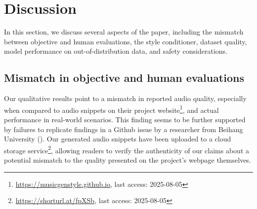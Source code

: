 \documentclass[a4paper,12pt,twoside]{article}
\begin{document}
\begin{table}[!h]
    \caption{Representative responses when evaluating generated audio}
    \centering
    \label{tab:common_quotes}
\end{table}

\section{Discussion}\label{sec:discussion}

In this section, we discuss several aspects of the paper, including the mismatch between objective and human evaluations, the style conditioner, dataset quality, model performance on out-of-distribution data, and safety considerations.

\subsection{Mismatch in objective and human evaluations}

Our qualitative results point to a mismatch in reported audio quality, especially when compared to audio snippets on their project website\footnote{\url{https://musicgenstyle.github.io}, last access: 2025-08-05}, and actual performance in real-world scenarios. This finding seems to be further supported by failures to replicate findings in a Github issue by a researcher from Beihang University (\cite{liuLargeDiscrepancyCLAP2024}). Our generated audio snippets have been uploaded to a cloud storage service\footnote{\url{https://shorturl.at/fpXSb}, last access: 2025-08-05}, allowing readers to verify the authenticity of our claims about a potential mismatch to the quality presented on the project's webpage themselves.
\end{document}
